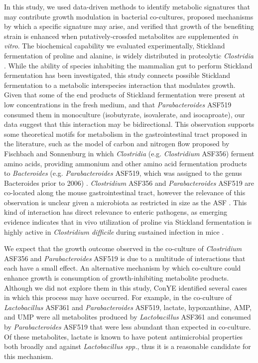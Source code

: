 \documentclass[11pt,onecolumn,notitlepage,openany,twoside]{book}
\begin{document}
\begin{refsection}
In this study, we used data-driven methods to identify metabolic signatures that may contribute growth modulation in bacterial co-cultures, proposed mechanisms by which a specific signature may arise, and verified that growth of the benefiting strain is enhanced when putatively-crossfed metabolites are supplemented \textit{in vitro}. The biochemical capability we evaluated experimentally, Stickland fermentation of proline and alanine, is widely distributed in proteolytic \textit{Clostridia} \cite{Mead1971-oa}. While the ability of species inhabiting the mammalian gut to perform Stickland fermentation has been investigated, this study connects possible Stickland fermentation to a metabolic interspecies interaction that modulates growth. Given that some of the end products of Stickland fermentation were present at low concentrations in the fresh medium, and that \textit{Parabacteroides} ASF519 consumed them in monoculture (isobutyrate, isovalerate, and isocaproate), our data suggest that this interaction may be bidirectional. This observation supports some theoretical motifs for metabolism in the gastrointestinal tract proposed in the literature, such as the model of carbon and nitrogen flow proposed by Fischbach and Sonnenburg in which \textit{Clostridia} (e.g. \textit{Clostridium} ASF356) ferment amino acids, providing ammonium and other amino acid fermentation products to \textit{Bacteroides} (e.g. \textit{Parabacteroides} ASF519, which was assigned to the genus Bacteroides prior to 2006) \cite{Fischbach2011-wg,Sakamoto2006-oz}. \textit{Clostridium} ASF356 and \textit{Parabacteroides} ASF519 are co-located along the mouse gastrointestinal tract, however the relevance of this observation is unclear given a microbiota as restricted in size as the ASF \cite{Sarma-Rupavtarm2004-jv}. This kind of interaction has direct relevance to enteric pathogens, as emerging evidence indicates that in vivo utilization of proline via Stickland fermentation is highly active in \textit{Clostridium difficile} during sustained infection in mice \cite{Fletcher2018-ws,Jenior2017-lv,Jenior2017-zv}.

We expect that the growth outcome observed in the co-culture of \textit{Clostridium} ASF356 and \textit{Parabacteroides} ASF519 is due to a multitude of interactions that each have a small effect. An alternative mechanism by which co-culture could enhance growth is consumption of growth-inhibiting metabolite products. Although we did not explore them in this study, ConYE identified several cases in which this process may have occurred. For example, in the co-culture of \textit{Lactobacillus} ASF361 and \textit{Parabacteroides} ASF519, lactate, hypoxanthine, AMP, and UMP were all metabolites produced by \textit{Lactobacillus} ASF361 and consumed by \textit{Parabacteroides} ASF519 that were less abundant than expected in co-culture. Of these metabolites, lactate is known to have potent antimicrobial properties both broadly and against \textit{Lactobacillus spp.}\cite{Shelef1994-lb}, thus it is a reasonable candidate for this mechanism.


\end{refsection}
\end{document}
